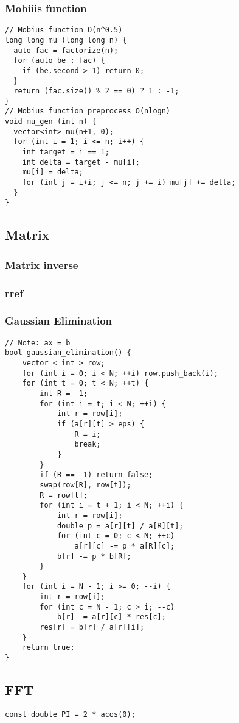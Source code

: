 \documentclass[10pt,landscape]{article}
\begin{document}
\begin{multicols}{2}
\subsubsection{Mobi\"us function}
\begin{lstlisting}
// Mobius function O(n^0.5)
long long mu (long long n) {
  auto fac = factorize(n);
  for (auto be : fac) {
    if (be.second > 1) return 0;
  }
  return (fac.size() % 2 == 0) ? 1 : -1;
}
// Mobius function preprocess O(nlogn)
void mu_gen (int n) {
  vector<int> mu(n+1, 0);
  for (int i = 1; i <= n; i++) {
    int target = i == 1;
    int delta = target - mu[i];
    mu[i] = delta;
    for (int j = i+i; j <= n; j += i) mu[j] += delta;
  }
}
\end{lstlisting}
\subsection{Matrix}
\subsubsection{Matrix inverse}
\subsubsection{rref}
\subsubsection{Gaussian Elimination}
\begin{lstlisting}
// Note: ax = b
bool gaussian_elimination() {
    vector < int > row;
    for (int i = 0; i < N; ++i) row.push_back(i);
    for (int t = 0; t < N; ++t) {
        int R = -1;
        for (int i = t; i < N; ++i) {
            int r = row[i];
            if (a[r][t] > eps) {
                R = i;
                break;
            }
        }
        if (R == -1) return false;
        swap(row[R], row[t]);
        R = row[t];
        for (int i = t + 1; i < N; ++i) {
            int r = row[i];
            double p = a[r][t] / a[R][t];
            for (int c = 0; c < N; ++c)
                a[r][c] -= p * a[R][c];
            b[r] -= p * b[R];
        }
    }
    for (int i = N - 1; i >= 0; --i) {
        int r = row[i];
        for (int c = N - 1; c > i; --c)
            b[r] -= a[r][c] * res[c];
        res[r] = b[r] / a[r][i];
    }
    return true;
}
\end{lstlisting}
\subsection{FFT}
\begin{lstlisting}
const double PI = 2 * acos(0);


\end{lstlisting}
\end{multicols}
\end{document}
